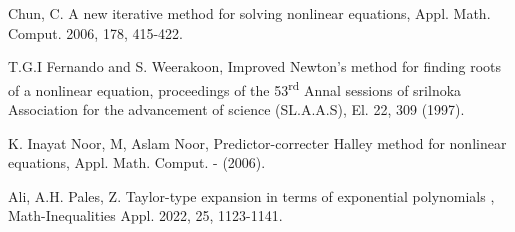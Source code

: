 \documentclass{arabicClass}
\begin{document}
	\renewcommand{\theequation}{\arabic{equation}.\arabic{chapter}}

	
    \amirifont
    
    
    	
    \arabicfont
	\tableofcontents
	\clearpage
	
	
	
	
	
\begin{thebibliography}{9}
	\begin{english}
		Chun, C. A new iterative method for solving nonlinear equations, Appl. Math. Comput. 2006, 178, 415-422.
		
		T.G.I Fernando and S. Weerakoon, Improved Newton's method for finding roots of a nonlinear equation, proceedings of the 53\textsuperscript{rd} Annal sessions of srilnoka Association for the advancement of science (SL.A.A.S), El. 22, 309 (1997).
		
		K. Inayat Noor, M, Aslam Noor, Predictor-correcter Halley method for nonlinear equations, Appl. Math. Comput. - (2006).
		
		Ali, A.H. Pales, Z. Taylor-type expansion in terms of exponential polynomials , Math-Inequalities Appl. 2022, 25, 1123-1141.
	\end{english}
\end{thebibliography}
	
\end{document}
